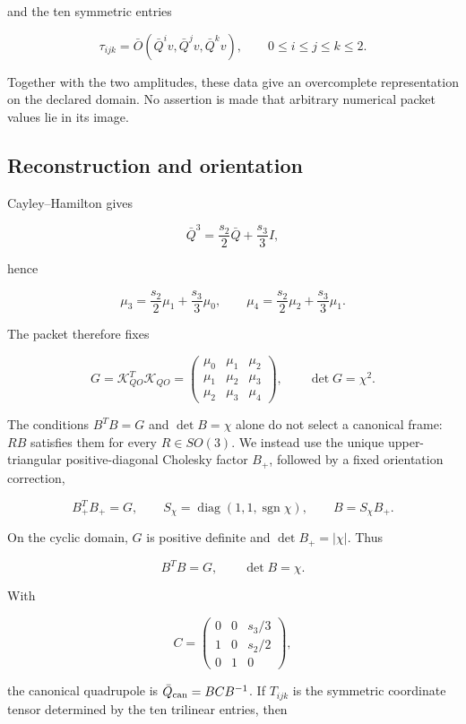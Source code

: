 \documentclass[
  11pt,
  a4paper]{article}
\begin{document}
and the ten symmetric entries

\[
\tau_{ijk}=\bar O(\bar Q^iv,\bar Q^jv,\bar Q^kv),
\qquad 0\le i\le j\le k\le2.
\]

Together with the two amplitudes, these data give an overcomplete representation on the declared domain. No assertion is made that arbitrary numerical packet values lie in its image.

\hypertarget{reconstruction-and-orientation}{%
\subsection{Reconstruction and orientation}\label{reconstruction-and-orientation}}

Cayley--Hamilton gives

\[
\bar Q^3=\frac{s_2}{2}\bar Q+\frac{s_3}{3}I,
\]

hence

\[
\mu_3=\frac{s_2}{2}\mu_1+\frac{s_3}{3}\mu_0,
\qquad
\mu_4=\frac{s_2}{2}\mu_2+\frac{s_3}{3}\mu_1.
\]

The packet therefore fixes

\[
G=\mathscr K_{QO}^{T}\mathscr K_{QO}
=\begin{pmatrix}
\mu_0&\mu_1&\mu_2\\
\mu_1&\mu_2&\mu_3\\
\mu_2&\mu_3&\mu_4
\end{pmatrix},
\qquad \det G=\chi^2.
\]

The conditions \(B^TB=G\) and \(\det B=\chi\) alone do not select a canonical frame: \(RB\) satisfies them for every \(R\in SO(3)\). We instead use the unique upper-triangular positive-diagonal Cholesky factor \(B_+\), followed by a fixed orientation correction,

\[
B_+^TB_+=G,\qquad
S_\chi=\operatorname{diag}(1,1,\operatorname{sgn}\chi),
\qquad B=S_\chi B_+.
\]

On the cyclic domain, \(G\) is positive definite and \(\det B_+=|\chi|\). Thus

\[
B^TB=G,\qquad \det B=\chi.
\]

With

\[
C=\begin{pmatrix}
0&0&s_3/3\\
1&0&s_2/2\\
0&1&0
\end{pmatrix},
\]

the canonical quadrupole is \(\bar Q_{\rm can}=BCB^{-1}\). If \(T_{ijk}\) is the symmetric coordinate tensor determined by the ten trilinear entries, then
\end{document}
